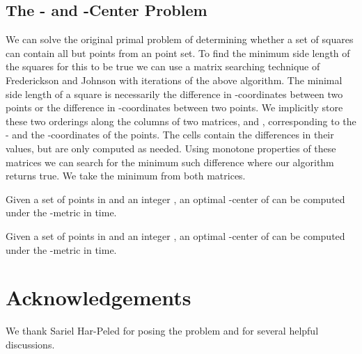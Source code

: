 \documentclass[11pt]{myclass}
\begin{document}
\subsection{The - and -Center Problem}
We can solve the original primal problem of determining whether a set of  squares can contain all but  points from an  point set.  To find the minimum side length of the squares for this to be true we can use a matrix searching technique of Frederickson and Johnson \cite{FJ82,FJ83,FJ84} with  iterations of the above algorithm.  The minimal side length of a square is necessarily the difference in -coordinates between two points or the difference in -coordinates between two points.  We implicitly store these two orderings along the columns of two matrices,  and , corresponding to the - and the -coordinates of the points.  The cells contain the differences in their values, but are only computed as needed.  Using monotone properties of these matrices we can search for the minimum such difference where our algorithm returns true.  We take the minimum from both matrices.  

\begin{theorem}
Given a set  of  points in  and an integer , an optimal -center of  can be computed under the -metric in  time.
\end{theorem}

\begin{theorem}
Given a set  of  points in  and an integer , an optimal -center of  can be computed under the -metric in  time.  
\end{theorem}

\section*{Acknowledgements}
We thank Sariel Har-Peled for posing the problem and for several helpful discussions.  



\end{document}
